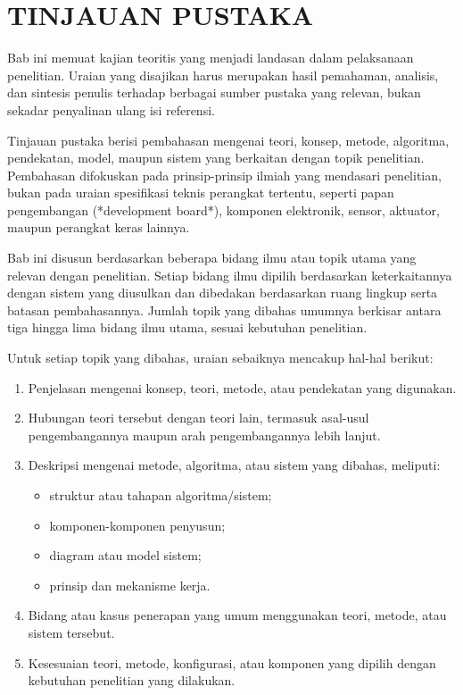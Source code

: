 \chapter{\MakeUppercase{Tinjauan Pustaka}}

Bab ini memuat kajian teoritis yang menjadi landasan dalam pelaksanaan penelitian. Uraian yang disajikan harus merupakan hasil pemahaman, analisis, dan sintesis penulis terhadap berbagai sumber pustaka yang relevan, bukan sekadar penyalinan ulang isi referensi.

Tinjauan pustaka berisi pembahasan mengenai teori, konsep, metode, algoritma, pendekatan, model, maupun sistem yang berkaitan dengan topik penelitian. Pembahasan difokuskan pada prinsip-prinsip ilmiah yang mendasari penelitian, bukan pada uraian spesifikasi teknis perangkat tertentu, seperti papan pengembangan (*development board*), komponen elektronik, sensor, aktuator, maupun perangkat keras lainnya.

Bab ini disusun berdasarkan beberapa bidang ilmu atau topik utama yang relevan dengan penelitian. Setiap bidang ilmu dipilih berdasarkan keterkaitannya dengan sistem yang diusulkan dan dibedakan berdasarkan ruang lingkup serta batasan pembahasannya. Jumlah topik yang dibahas umumnya berkisar antara tiga hingga lima bidang ilmu utama, sesuai kebutuhan penelitian.

Untuk setiap topik yang dibahas, uraian sebaiknya mencakup hal-hal berikut:

\begin{enumerate}[topsep=0pt,itemsep=0pt,parsep=0pt,leftmargin=*]
\item Penjelasan mengenai konsep, teori, metode, atau pendekatan yang digunakan.
\item Hubungan teori tersebut dengan teori lain, termasuk asal-usul pengembangannya maupun arah pengembangannya lebih lanjut.
\item Deskripsi mengenai metode, algoritma, atau sistem yang dibahas, meliputi:
\begin{itemize}[topsep=0pt,itemsep=0pt,parsep=0pt,leftmargin=*]
\item struktur atau tahapan algoritma/sistem;
\item komponen-komponen penyusun;
\item diagram atau model sistem;
\item prinsip dan mekanisme kerja.
\end{itemize}
\item Bidang atau kasus penerapan yang umum menggunakan teori, metode, atau sistem tersebut.
\item Kesesuaian teori, metode, konfigurasi, atau komponen yang dipilih dengan kebutuhan penelitian yang dilakukan.
\end{enumerate}

